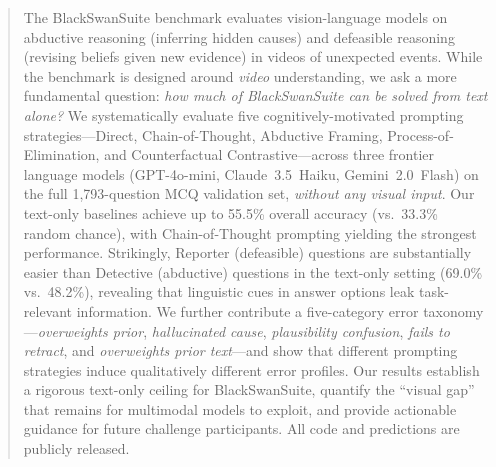 \begin{abstract}
The BlackSwanSuite benchmark evaluates vision-language models on abductive reasoning (inferring hidden causes) and defeasible reasoning (revising beliefs given new evidence) in videos of unexpected events.
While the benchmark is designed around \emph{video} understanding, we ask a more fundamental question: \textit{how much of BlackSwanSuite can be solved from text alone?}
We systematically evaluate five cognitively-motivated prompting strategies---Direct, Chain-of-Thought, Abductive Framing, Process-of-Elimination, and Counterfactual Contrastive---across three frontier language models (GPT-4o-mini, Claude~3.5~Haiku, Gemini~2.0~Flash) on the full 1{,}793-question MCQ validation set, \emph{without any visual input}.
Our text-only baselines achieve up to 55.5\% overall accuracy (vs.\ 33.3\% random chance), with Chain-of-Thought prompting yielding the strongest performance.
Strikingly, Reporter (defeasible) questions are substantially easier than Detective (abductive) questions in the text-only setting (69.0\% vs.\ 48.2\%), revealing that linguistic cues in answer options leak task-relevant information.
We further contribute a five-category error taxonomy---\emph{overweights prior}, \emph{hallucinated cause}, \emph{plausibility confusion}, \emph{fails to retract}, and \emph{overweights prior text}---and show that different prompting strategies induce qualitatively different error profiles.
Our results establish a rigorous text-only ceiling for BlackSwanSuite, quantify the ``visual gap'' that remains for multimodal models to exploit, and provide actionable guidance for future challenge participants.
All code and predictions are publicly released.
\end{abstract}
